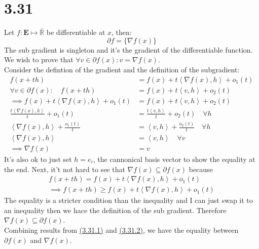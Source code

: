 \documentclass[]{article}
\begin{document}
\section*{3.31}
    Let $f: \mathbf{E} \mapsto \bar{\mathbb{R}}$ be differentiable at $x$, then: 
    $$
        \partial f = \{\nabla f(x)\} 
    $$
    The sub gradient is singleton and it's the gradient of the differentiable function. 
    \\[1.1em]
    We wish to prove that $\forall v \in \partial f(x): v = \nabla f (x)$. 
    \\
    Consider the defintion of the gradient and the definition of the subgradient: 
    \begin{align*}\tag{3.31.1}\label{eqn:3.31.1}
        f(x + th) &= f(x) + t \left\langle \nabla f(x), h \right\rangle + o_1(t)
        \\
        \forall v \in \partial f(x): \quad 
        f(x + th) &= f(x) + t \left\langle v, h \right\rangle + o_2(t)
        \\
        \implies
        f(x) + t \left\langle \nabla f(x), h \right\rangle + o_1(t) &= 
        f(x) + t \left\langle v, h \right\rangle + o_2(t)
        \\
        \frac{t \left\langle \nabla f(x), h \right\rangle}{t} + o_1(t)
        &= 
        \frac{t \left\langle v, h \right\rangle}{t} + o_2(t) \quad \forall h
        \\
        \left\langle \nabla f(x), h \right\rangle + \frac{o_1(t)}{t} &= \left\langle v, h \right\rangle + 
        \frac{o_2(t)}{t}\quad \forall h 
        \\
        \left\langle \nabla f(x), h \right\rangle &= \left\langle v, h \right\rangle \quad \forall v
        \\
        \implies \nabla f(x) &= v 
    \end{align*}
    It's also ok to just set $h = e_i$, the cannonical basis vector to show the equality at the end. 
    Next, it't not hard to see that $\nabla f(x) \subseteq \partial f(x)$ because 
    \begin{align*}\tag{3.31.2}\label{eqn:3.31.2}
        f(x + th) = f(x) + t \left\langle \nabla f(x), h \right\rangle + o_1(t) 
        \\
        \implies f(x + th) \ge f(x) + t \left\langle \nabla f(x), h \right\rangle + o_1(t) 
    \end{align*}
    The equality is a stricter condition than the inequality and I can just swap it to an inequality then we hace the definition of the sub gradient. Therefore $\nabla f(x) \subseteq \partial f(x)$. 
    \\
    Combining results from \hyperref[eqn:3.31.1]{(3.31.1)} and \hyperref[eqn:3.31.2]{(3.31.2)}, we have the equality between $\partial f(x)$ and $\nabla f(x)$. 
\end{document}
